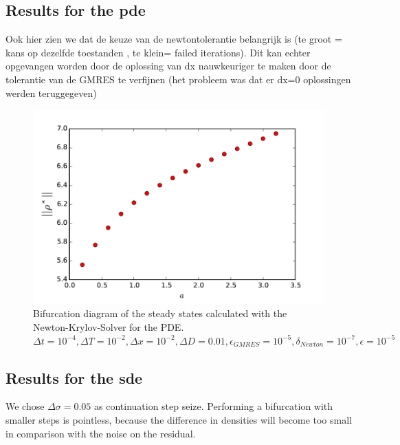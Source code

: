\documentclass[]{article}
\theoremstyle{definition}
\begin{document}
\subsection{Results for the pde}
Ook hier zien we dat de keuze van de newtontolerantie belangrijk is (te groot = kans op dezelfde toestanden , te klein= failed iterations).
Dit kan echter opgevangen worden door de oplossing van dx nauwkeuriger te maken door de tolerantie van de GMRES te verfijnen (het probleem was dat er dx=0 oplossingen werden teruggegeven) 

\begin{figure}
\includegraphics{../Problems/WeightedParticles/checkSystem/plots/bifurcation_pde(D)}
\caption{  Bifurcation diagram of the steady states calculated with the Newton-Krylov-Solver for the PDE. $\Delta t = 10^{-4}, \Delta T = 10^{-2}, \Delta x = 10^{-2}, \Delta D = 0.01, \epsilon_{GMRES}=10^{-5},  \delta_{Newton} = 10^{-7}, \epsilon=10^{-5}$
}
\end{figure}

\subsection{Results for the sde}
We chose $\Delta \sigma = 0.05$ as continuation step seize. Performing a bifurcation with smaller steps is pointless, because the difference in densities will become too small in comparison with the noise on the residual.
\end{document}

